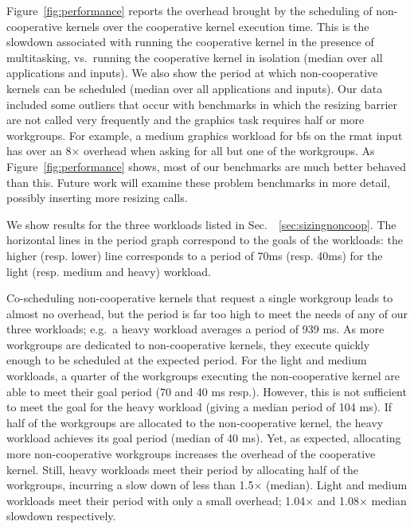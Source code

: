 \documentclass[sigconf]{acmart}
\newcommand{\myfiglong}{Figure~}
\newcommand{\mysec}{Sec.~}
\begin{document}
{ \myfiglong\ref{fig:performance} reports the
overhead brought by the scheduling of non-cooperative kernels over the
cooperative kernel execution time.  This is the slowdown associated
with running the cooperative kernel in the presence of multitasking,
vs.\ running the cooperative kernel in isolation (median over all
applications and inputs).  We also show the period at which
non-cooperative kernels can be scheduled (median over all applications
and inputs). Our data included some outliers that occur with
benchmarks in which the resizing barrier are not called very
frequently and the graphics task requires half or more workgroups. For
example, a medium graphics workload for bfs on the rmat input has over
an 8$\times$ overhead when asking for all but one of the
workgroups. As \myfiglong\ref{fig:performance} shows, most of our
benchmarks are much better behaved than this. Future work
will examine these problem benchmarks in more detail,
possibly inserting more resizing calls.

We show results for the three workloads listed in
\mysec~\ref{sec:sizingnoncoop}. The horizontal lines in the period
graph correspond to the goals of the workloads: the higher
(resp. lower) line corresponds to a period of 70ms (resp. 40ms) for
the light (resp. medium and heavy) workload.

Co-scheduling non-cooperative kernels that request a single workgroup
leads to almost no overhead, but the period is far too high to meet
the needs of any of our three workloads; e.g.\ a heavy workload
averages a period of 939 ms. As more workgroups are dedicated to
non-cooperative kernels, they execute quickly enough to be scheduled
at the expected period. For the light and medium workloads, a quarter
of the workgroups executing the non-cooperative kernel are able to
meet their goal period (70 and 40 ms resp.). However, this is not
sufficient to meet the goal for the heavy workload (giving a median
period of 104 ms). If half of the workgroups are allocated to the
non-cooperative kernel, the heavy workload achieves its goal period
(median of 40 ms).
%
Yet, as expected, allocating more non-cooperative workgroups increases
the overhead of the cooperative kernel.
%
Still, heavy workloads meet their period by allocating half
of the workgroups, incurring a slow down of less than
1.5$\times$ (median). Light and medium workloads meet their period
with only a small overhead; 1.04$\times$ and 1.08$\times$ median
slowdown respectively.


}
\end{document}
